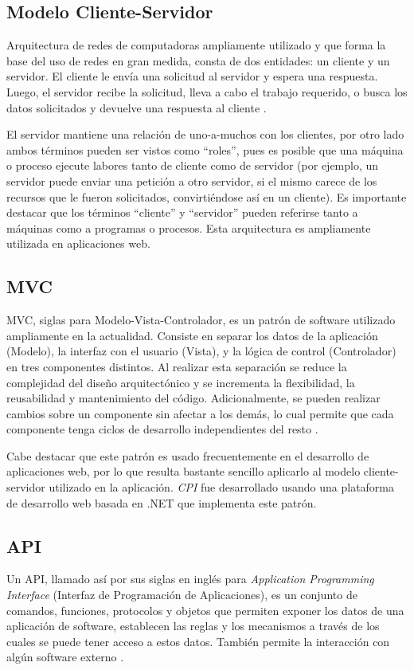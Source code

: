 \subsection{Modelo Cliente-Servidor}
Arquitectura de redes de computadoras ampliamente utilizado y que forma la base del uso de redes en gran medida, consta de dos entidades: un cliente y un servidor. El cliente le envía una solicitud al servidor y espera una respuesta. Luego, el servidor recibe la solicitud, lleva a cabo el trabajo requerido, o busca los datos solicitados y devuelve una respuesta al cliente \cite{redesTanenbaum}.

El servidor mantiene una relación de uno-a-muchos con los clientes, por otro lado ambos términos pueden ser vistos como “roles”, pues es posible que una máquina o proceso ejecute labores tanto de cliente como de servidor (por ejemplo, un servidor puede enviar una petición a otro servidor, si el mismo carece de los recursos que le fueron solicitados, convirtiéndose así en un cliente). Es importante destacar que los términos “cliente” y “servidor” pueden referirse tanto a máquinas como a programas o procesos. Esta arquitectura es ampliamente utilizada en aplicaciones web.

\subsection{MVC}
MVC, siglas para Modelo-Vista-Controlador, es un patrón de software utilizado ampliamente en la actualidad. Consiste en separar los datos de la aplicación (Modelo), la interfaz con el usuario (Vista), y la lógica de control (Controlador) en tres componentes distintos. Al realizar esta separación se reduce la complejidad del diseño arquitectónico y se incrementa la flexibilidad, la reusabilidad y mantenimiento del código. Adicionalmente, se pueden realizar cambios sobre un componente sin afectar a los demás, lo cual permite que cada componente tenga ciclos de desarrollo independientes del resto \cite{mvcKrasner}. 

Cabe destacar que este patrón es usado frecuentemente en el desarrollo de aplicaciones web, por lo que resulta bastante sencillo aplicarlo al modelo cliente-servidor utilizado en la aplicación. \textit{CPI} fue desarrollado usando una plataforma de desarrollo web basada en .NET que implementa este patrón.

\subsection{API}
Un API, llamado así por sus siglas en inglés para \textit{Application Programming Interface} (Interfaz de Programación de Aplicaciones), es un conjunto de comandos, funciones, protocolos y objetos que permiten exponer los datos de una aplicación de software, establecen las reglas y los mecanismos a través de los cuales se puede tener acceso a estos datos. También permite la interacción con algún software externo \cite{apiChristensson}.

